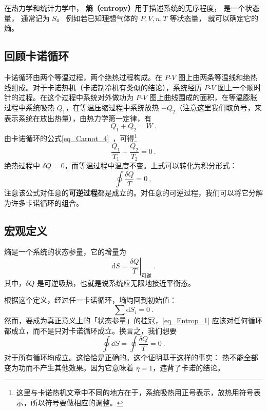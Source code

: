 
在热力学和统计力学中， \textbf{熵（entropy）}用于描述系统的无序程度， 是一个状态量， 通常记为 $S$。 例如若已知理想气体的 $P, V, n, T$ 等状态量， 就可以确定它的熵。

\subsection{回顾卡诺循环}

卡诺循环由两个等温过程，两个绝热过程构成。在 $P$-$V$ 图上由两条等温线和绝热线组成。对于卡诺热机（卡诺制冷机有类似的结论），系统经历 $P$-$V$ 图上一个顺时针的过程。在这个过程中系统对外做功为 $P$-$V$ 图上曲线围成的面积，在等温膨胀过程中系统吸热 $Q_1$，在等温压缩过程中系统放热 $-Q_2$（注意这里我们取负号，来表示系统在放出热量），由热力学第一定律，有
\begin{equation}
Q_1+Q_2=W~.
\end{equation}
由卡诺循环的公式\autoref{eq_Carnot_4}~，可得\footnote{这里与卡诺热机文章中不同的地方在于，系统吸热用正号表示，放热用符号表示，所以符号要做相应的调整。}
\begin{equation}
\frac{Q_1}{T_1}+\frac{Q_2}{T_2}=0~.
\end{equation}
绝热过程中 $\delta Q=0$，而等温过程中温度不变。上式可以转化为积分形式：
\begin{equation}
\oint \frac{\delta Q}{T}=0~,
\end{equation}
注意该公式对任意的\textbf{可逆过程}都是成立的。对任意的可逆过程，我们可以将它分解为许多卡诺循环的组合。

\subsection{宏观定义}

熵是一个系统的状态参量，它的增量为
\begin{equation}
\mathrm{d} S = \left . \frac{\delta Q}{T}\right |_{\text{可逆}}~.
\end{equation}
其中，$\delta Q$ 是可逆吸热，也就是说系统应无限地接近平衡态。

根据这个定义，经过任一卡诺循环，墒均回到初始值：
\begin{equation} \label{eq_Entrop_1}
\sum{\text{d}S_i=0}~.
\end{equation}
然而，要成为真正意义上的「状态参量」的桂冠，\autoref{eq_Entrop_1} 应该对任何循环都成立，而不是只对卡诺循环成立。换言之，我们想要
\begin{equation}
\oint \dd S =\oint \frac{\delta Q}{T}=0~.
\end{equation}
对于所有循环均成立。这恰恰是正确的。这个证明基于这样的事实： 热不能全部变为功而不产生其他效果。因为它意味着 $\eta=1$，违背了卡诺的结论。


